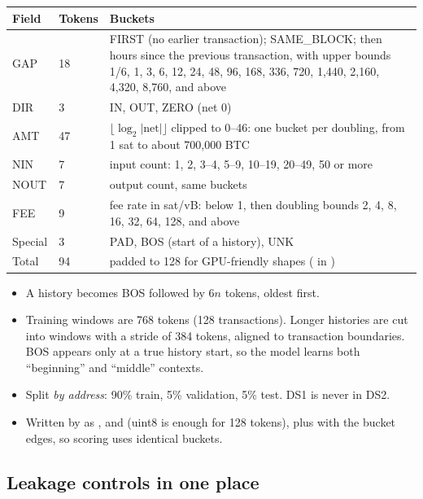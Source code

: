 \begin{center}
\small
\begin{tabularx}{\textwidth}{@{}L{1.5cm}C{1.2cm}Y@{}}
\toprule
\textbf{Field} & \textbf{Tokens} & \textbf{Buckets} \\
\midrule
GAP & 18 & FIRST (no earlier transaction); SAME\_BLOCK; then hours since the previous transaction, with upper bounds 1/6, 1, 3, 6, 12, 24, 48, 96, 168, 336, 720, 1,440, 2,160, 4,320, 8,760, and above \\
DIR & 3 & IN, OUT, ZERO (net 0) \\
AMT & 47 & $\lfloor \log_2 |\text{net}| \rfloor$ clipped to 0--46: one bucket per doubling, from 1 sat to about 700,000 BTC \\
NIN & 7 & input count: 1, 2, 3--4, 5--9, 10--19, 20--49, 50 or more \\
NOUT & 7 & output count, same buckets \\
FEE & 9 & fee rate in sat/vB: below 1, then doubling bounds 2, 4, 8, 16, 32, 64, 128, and above \\
Special & 3 & PAD, BOS (start of a history), UNK \\
\midrule
Total & 94 & padded to 128 for GPU-friendly shapes ( in ) \\
\bottomrule
\end{tabularx}
\end{center}

\begin{itemize}
  \item A history becomes BOS followed by $6n$ tokens, oldest first.
  \item Training windows are 768 tokens (128 transactions). Longer histories are cut into windows
    with a stride of 384 tokens, aligned to transaction boundaries. BOS appears only at a true
    history start, so the model learns both ``beginning'' and ``middle'' contexts.
  \item Split \emph{by address}: 90\% train, 5\% validation, 5\% test. DS1 is never in DS2.
  \item Written by  as ,  and
     (uint8 is enough for 128 tokens), plus  with the bucket edges,
    so scoring uses identical buckets.
\end{itemize}

\subsection{Leakage controls in one place}
\label{sec:leakage}

